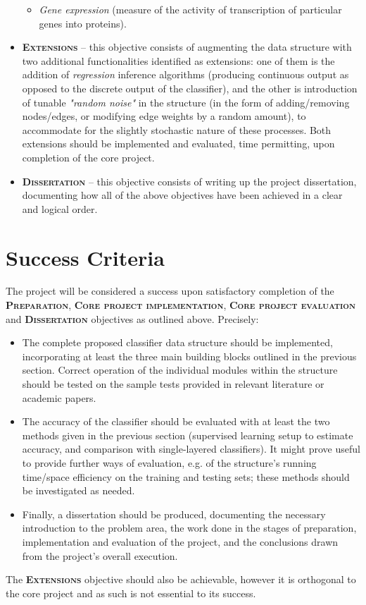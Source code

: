\begin{itemize}
\begin{itemize}
        \item \emph{Gene expression} (measure of the activity of transcription of particular genes into proteins).
    \end{itemize}
    \item \textbf{\textsc{Extensions}} -- this objective consists of augmenting the data structure with two additional functionalities identified as extensions: one of them is the addition of \emph{regression} inference algorithms (producing continuous output as opposed to the discrete output of the classifier), and the other is introduction of tunable \emph{"random noise"} in the structure (in the form of adding/removing nodes/edges, or modifying edge weights by a random amount), to accommodate for the slightly stochastic nature of these processes. Both extensions should be implemented and evaluated, time permitting, upon completion of the core project.
    \item \textbf{\textsc{Dissertation}} -- this objective consists of writing up the project dissertation, documenting how all of the above objectives have been achieved in a clear and logical order.
\end{itemize}

\section*{Success Criteria}

The project will be considered a success upon satisfactory completion of the \textbf{\textsc{Preparation}}, \textbf{\textsc{Core project implementation}}, \textbf{\textsc{Core project evaluation}} and \textbf{\textsc{Dissertation}} objectives as outlined above. Precisely:
\begin{itemize}
    \item The complete proposed classifier data structure should be implemented, incorporating at least the three main building blocks outlined in the previous section. Correct operation of the individual modules within the structure should be tested on the sample tests provided in relevant literature or academic papers.
    \item The accuracy of the classifier should be evaluated with at least the two methods given in the previous section (supervised learning setup to estimate accuracy, and comparison with single-layered classifiers). It might prove useful to provide further ways of evaluation, e.g. of the structure's running time/space efficiency on the training and testing sets; these methods should be investigated as needed.
    \item Finally, a dissertation should be produced, documenting the necessary introduction to the problem area, the work done in the stages of preparation, implementation and evaluation of the project, and the conclusions drawn from the project's overall execution.
\end{itemize}
 The \textbf{\textsc{Extensions}} objective should also be achievable, however it is orthogonal to the core project and as such is not essential to its success.

